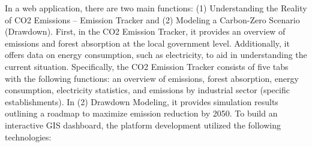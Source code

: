 In a web application, there are two main functions: (1) Understanding the Reality of CO2 Emissions – Emission Tracker and (2) Modeling a Carbon-Zero Scenario (Drawdown). First, in the CO2 Emission Tracker, it provides an overview of emissions and forest absorption at the local government level. Additionally, it offers data on energy consumption, such as electricity, to aid in understanding the current situation. Specifically, the CO2 Emission Tracker consists of five tabs with the following functions: an overview of emissions, forest absorption, energy consumption, electricity statistics, and emissions by industrial sector (specific establishments). In (2) Drawdown Modeling, it provides simulation results outlining a roadmap to maximize emission reduction by 2050. To build an interactive GIS dashboard, the platform development utilized the following technologies: \par

